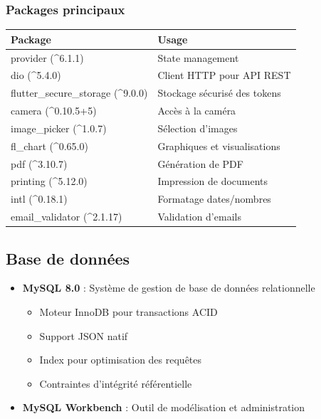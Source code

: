 \documentclass[a4paper,11pt]{report}
\begin{document}
\subsubsection{Packages principaux}

\begin{longtable}{|p{}|p{}|}
    \hline
    \textbf{Package} & \textbf{Usage} \\ \hline
    \endhead
    
    provider (^6.1.1) & State management \\ \hline
    dio (^5.4.0) & Client HTTP pour API REST \\ \hline
    flutter\_secure\_storage (^9.0.0) & Stockage sécurisé des tokens \\ \hline
    camera (^0.10.5+5) & Accès à la caméra \\ \hline
    image\_picker (^1.0.7) & Sélection d'images \\ \hline
    fl\_chart (^0.65.0) & Graphiques et visualisations \\ \hline
    pdf (^3.10.7) & Génération de PDF \\ \hline
    printing (^5.12.0) & Impression de documents \\ \hline
    intl (^0.18.1) & Formatage dates/nombres \\ \hline
    email\_validator (^2.1.17) & Validation d'emails \\ \hline
\end{longtable}

\subsection{Base de données}

\begin{itemize}
    \item \textbf{MySQL 8.0} : Système de gestion de base de données relationnelle
    \begin{itemize}
        \item Moteur InnoDB pour transactions ACID
        \item Support JSON natif
        \item Index pour optimisation des requêtes
        \item Contraintes d'intégrité référentielle
    \end{itemize}
    
    \item \textbf{MySQL Workbench} : Outil de modélisation et administration
\end{itemize}
\end{document}
